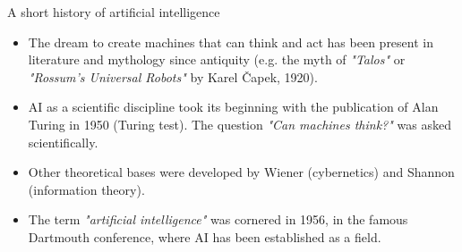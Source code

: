 \documentclass[xcolor=pdftex,dvipsnames,table]{beamer}
\begin{document}
\begin{frame}{A short history of artificial intelligence}
\begin{itemize}
	\item The dream to create machines that can think and act has been present in literature and mythology since antiquity (e.g. the myth of \emph{"Talos"} or \emph{"Rossum's Universal Robots"} by Karel \v{C}apek, 1920).
	\item AI as a scientific discipline took its beginning with the publication of Alan Turing in 1950 (Turing test). The question \emph{"Can machines think?"} was asked scientifically.
	\item Other theoretical bases were developed by Wiener (cybernetics) and Shannon (information theory). 
	\item The term \emph{"artificial intelligence"} was cornered in 1956, in the famous Dartmouth conference, where AI has been established as a field.
\end{itemize}
\end{frame}
\end{document}
